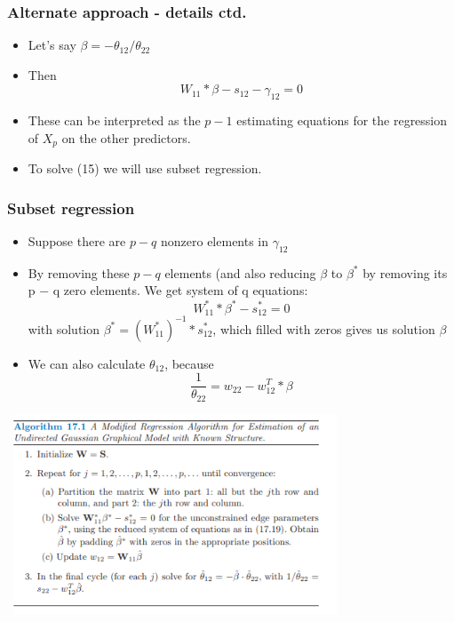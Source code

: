 \documentclass{beamer}
\begin{document}
\begin{frame}
\frametitle{Alternate approach - details ctd.}
\begin{itemize}

\item Let's say $\beta = −\theta_{12} / \theta_{22}$
\item Then 
\begin{equation}
W_{11}*\beta-s_{12}-\gamma_{12} = 0
\end{equation}
\item These can be interpreted as the $p - 1$ estimating equations for the regression of $X_p$ on the other predictors.
\item To solve (15) we will use subset regression.
\end{itemize}
\end{frame}

\begin{frame}
\frametitle{Subset regression}
\begin{itemize}
\item Suppose there are $p−q$ nonzero elements in $\gamma_{12}$
\item By removing these $p-q$ elements (and also reducing $\beta$ to $\beta^*$ by removing its p − q zero elements. We get system of q equations:
\begin{equation}
W_{11}^* * \beta^* - s_{12}^* = 0
\end{equation}
with solution $\beta^* = (W_{11}^*)^{-1} * s_{12}^*$, which filled with zeros gives us solution $\beta$
\item We can also calculate $\theta_{12}$, because 
\begin{equation}
\frac{1}{\theta_{22}} = w_{22} - w_{12}^T * \beta
\end{equation}
\end{itemize}
\end{frame}
\begin{frame}
\includegraphics[width=10cm, height=6cm]{Algorithm linear regression}
\end{frame}
\end{document}

